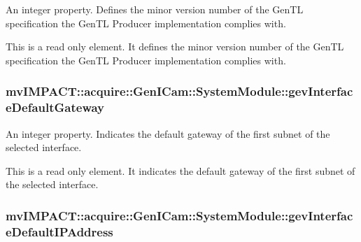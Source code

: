 An integer property. Defines the minor version number of the Gen\+T\+L specification the Gen\+T\+L Producer implementation complies with. 

This is a read only element. It defines the minor version number of the Gen\+T\+L specification the Gen\+T\+L Producer implementation complies with. \hypertarget{classmv_i_m_p_a_c_t_1_1acquire_1_1_gen_i_cam_1_1_system_module_a892fdf7b71a2bb07fc27b03b5752237e}{
\subsubsection[{gev\+Interface\+Default\+Gateway}]{ mv\+I\+M\+P\+A\+C\+T\+::acquire\+::\+Gen\+I\+Cam\+::\+System\+Module\+::gev\+Interface\+Default\+Gateway}}\label{classmv_i_m_p_a_c_t_1_1acquire_1_1_gen_i_cam_1_1_system_module_a892fdf7b71a2bb07fc27b03b5752237e}


An integer property. Indicates the default gateway of the first subnet of the selected interface. 

This is a read only element. It indicates the default gateway of the first subnet of the selected interface. \hypertarget{classmv_i_m_p_a_c_t_1_1acquire_1_1_gen_i_cam_1_1_system_module_ab02912952d8611f5b7c08714c18e7729}{
\subsubsection[{gev\+Interface\+Default\+I\+P\+Address}]{ mv\+I\+M\+P\+A\+C\+T\+::acquire\+::\+Gen\+I\+Cam\+::\+System\+Module\+::gev\+Interface\+Default\+I\+P\+Address}}\label{classmv_i_m_p_a_c_t_1_1acquire_1_1_gen_i_cam_1_1_system_module_ab02912952d8611f5b7c08714c18e7729}


